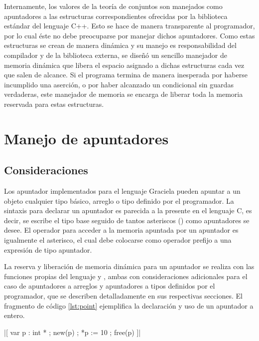 {{Internamente, los valores de la teoría de conjuntos son manejados como
apuntadores a las estructuras correspondientes ofrecidas por la biblioteca
estándar del lenguaje C++. Esto se hace de manera transparente al programador,
por lo cual éste no debe preocuparse por manejar dichos apuntadores. Como  estas
estructuras se crean de manera dinámica y su manejo es responsabilidad del
compilador y de la biblioteca externa, se diseñó un sencillo manejador de
memoria dinámica que libera el espacio asignado a dichas estructuras cada vez
que salen de alcance. Si el programa termina de manera inesperada por haberse
incumplido una aserción, o por haber alcanzado un condicional sin guardas
verdaderas, este manejador de memoria se encarga de liberar toda la memoria
reservada para estas estructuras.


\section{Manejo de apuntadores}

\subsection{Consideraciones}
Los apuntador implementados para el lenguaje Graciela pueden apuntar a un
objeto cualquier tipo básico, arreglo o tipo definido por el programador. La
sintaxis para declarar un apuntador es parecida a la presente en  el lenguaje
C, es decir, se escribe el tipo base seguido de tantos asteriscos (\ingra{*})
como apuntadores se desee. El operador para acceder a la memoria apuntada por
un apuntador es igualmente el asterisco, el cual debe colocarse como operador
prefijo a una expresión de tipo apuntador.

La reserva y liberación de memoria dinámica para un apuntador se realiza con las
funciones propias del lenguaje  y , ambas con
consideraciones adicionales para el caso de apuntadores a arreglos y apuntadores
a tipos definidos por el programador, que se describen detalladamente en sus
respectivas secciones. El fragmento de código \ref{lst:point} ejemplifica la
declaración y uso de un apuntador a entero.

\begin{gracielacode}[caption=Uso de apuntadores, label=lst:point]
|[ var p : int *
;  new(p)
;  *p := 10
;  free(p)
]|
\end{gracielacode}

}}
